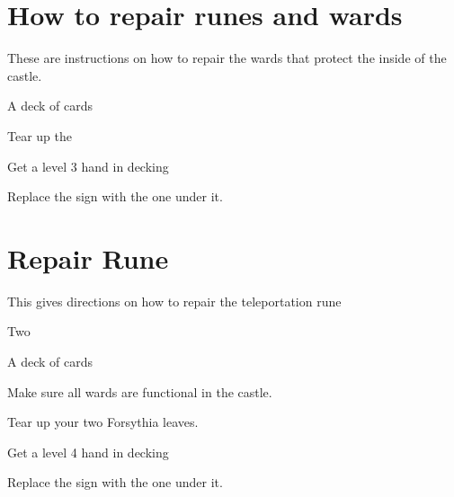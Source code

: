 \documentclass[green]{guildcamp2}
\begin{document}
\name{\gOnyxRep{}}

\section{How to repair runes and wards}
These are instructions on how to repair the wards that protect the inside of the castle.

\begin{enum}[Requirements]
	\item \iForsythia{}
	\item \iWardBook{}
	\item A deck of cards
\end{enum}
	
\begin{enum}[Directions]
	\item Tear up the \iForsythia{}
	\item Get a level 3 hand in decking
	\item Replace the sign with the one under it.
\end{enum}

\clearpage
\section{Repair Rune}
This gives directions on how to repair the teleportation rune

\begin{enum}[Requirements]
	\item Two \iForsythia{}
	\item \iWardBook{}
	\item A deck of cards
\end{enum}

\begin{enum}[Directions]
	\item Make sure all wards are functional in the castle.
	\item Tear up your two Forsythia leaves.
	\item Get a level 4 hand in decking
	\item Replace the sign with the one under it.
\end{enum}
	
\end{document}
